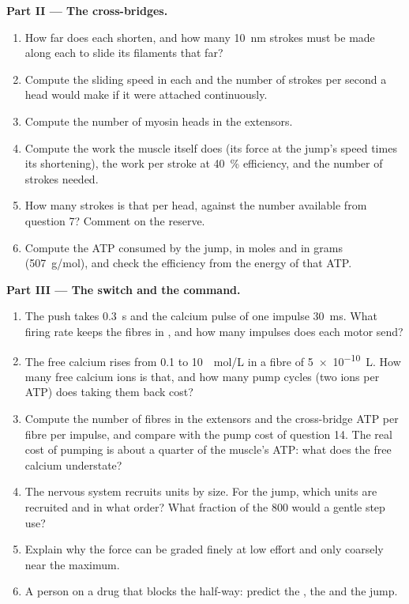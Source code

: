 \begin{problem}
\medskip
\noindent\textbf{Part II --- The cross-bridges.}
\begin{enumerate}[resume]
  \item How far does each  shorten, and how many
        \qty{10}{nm} strokes must be made along each 
        to slide its filaments that far?
  \item Compute the sliding speed in each  and the
        number of strokes per second a head would make if it were
        attached continuously.
  \item Compute the number of myosin heads in the extensors.
  \item Compute the work the muscle itself does (its force at the
        jump's speed times its shortening), the work per stroke at
        \qty{40}{\%} efficiency, and the number of strokes needed.
  \item How many strokes is that per head, against the number
        available from question 7? Comment on the reserve.
  \item Compute the ATP consumed by the jump, in moles and in grams
        (\qty{507}{g/mol}), and check the efficiency from the energy
        of that ATP.
\end{enumerate}

\medskip
\noindent\textbf{Part III --- The switch and the command.}
\begin{enumerate}[resume]
  \item The push takes \qty{0.3}{s} and the calcium pulse of one
        impulse \qty{30}{ms}. What firing rate keeps the fibres in
        , and how many impulses does each motor  send?
  \item The free calcium rises from \qty{0.1}{} to \qty{10}{\micro
        mol/L} in a fibre of \qty{5e-10}{L}. How many free calcium ions
        is that, and how many pump cycles (two ions per ATP) does
        taking them back cost?
  \item Compute the number of fibres in the extensors and the
        cross-bridge ATP per fibre per impulse, and compare with the
        pump cost of question 14. The real cost of pumping is about
        a quarter of the muscle's ATP: what does the free calcium
        understate?
  \item The nervous system recruits units by size. For the jump,
        which units are recruited and in what order? What fraction
        of the \num{800} would a gentle step use?
  \item Explain why the force can be graded finely at low effort and
        only coarsely near the maximum.
  \item A person on a drug that blocks the 
        half-way: predict the , the  and the jump.
\end{enumerate}


\end{problem}

